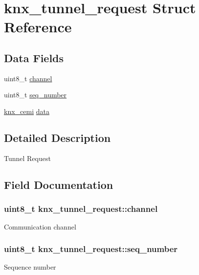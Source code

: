 \hypertarget{structknx__tunnel__request}{}\section{knx\+\_\+tunnel\+\_\+request Struct Reference}
\label{structknx__tunnel__request}
\subsection*{Data Fields}
\begin{DoxyCompactItemize}
\item 
uint8\+\_\+t \hyperlink{structknx__tunnel__request_a9807076e5543ddbf08d51d518910457b}{channel}
\item 
uint8\+\_\+t \hyperlink{structknx__tunnel__request_ab88c07a5c5ce20f6c3a98f5f3d16d398}{seq\+\_\+number}
\item 
\hyperlink{structknx__cemi}{knx\+\_\+cemi} \hyperlink{structknx__tunnel__request_ae9fad51a8486998118c72419d7e6ac4f}{data}
\end{DoxyCompactItemize}


\subsection{Detailed Description}
Tunnel Request 

\subsection{Field Documentation}
\subsubsection[{\texorpdfstring{channel}{channel}}]{\setlength{\rightskip}{0pt plus 5cm}uint8\+\_\+t knx\+\_\+tunnel\+\_\+request\+::channel}\hypertarget{structknx__tunnel__request_a9807076e5543ddbf08d51d518910457b}{}\label{structknx__tunnel__request_a9807076e5543ddbf08d51d518910457b}
Communication channel 
\subsubsection[{\texorpdfstring{seq\+\_\+number}{seq_number}}]{\setlength{\rightskip}{0pt plus 5cm}uint8\+\_\+t knx\+\_\+tunnel\+\_\+request\+::seq\+\_\+number}\hypertarget{structknx__tunnel__request_ab88c07a5c5ce20f6c3a98f5f3d16d398}{}\label{structknx__tunnel__request_ab88c07a5c5ce20f6c3a98f5f3d16d398}
Sequence number 
